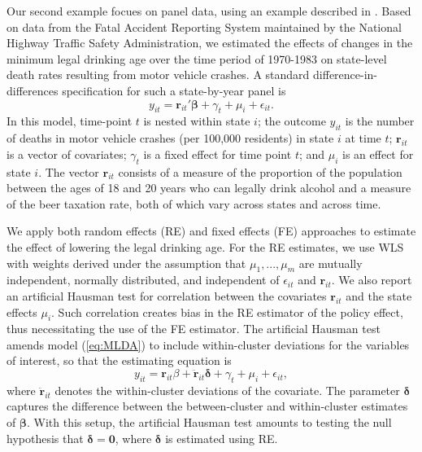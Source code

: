 \documentclass[draft]{ectaart}\usepackage[]{graphicx}\usepackage[]{color}
\newcommand{\bm}{\mathbf}
\newcommand{\bs}{\boldsymbol}
\begin{document}
Our second example focues on panel data, using an example described in \citet[see also \citealp{Carpenter2011minimum}]{Angrist2014mastering}.
Based on data from the Fatal Accident Reporting System maintained by the National Highway Traffic Safety Administration, we estimated the effects of changes in the minimum legal drinking age over the time period of 1970-1983 on state-level death rates resulting from motor vehicle crashes.
A standard difference-in-differences specification for such a state-by-year panel is
\begin{equation}
\label{eq:MLDA}
y_{it} = \bm{r}_{it}'\bs\beta + \gamma_t + \mu_i + \epsilon_{it}.
\end{equation}
In this model, time-point $t$ is nested within state $i$; the outcome $y_{it}$ is the number of deaths in motor vehicle crashes (per 100,000 residents) in state $i$ at time $t$; $\bm{r}_{it}$ is a vector of covariates; $\gamma_t$ is a fixed effect for time point $t$; and $\mu_i$ is an effect for state $i$. The vector $\bm{r}_{it}$ consists of a measure of the proportion of the population between the ages of 18 and 20 years who can legally drink alcohol and a measure of the beer taxation rate, both of which vary across states and across time.

We apply both random effects (RE) and fixed effects (FE) approaches to estimate the effect of lowering the legal drinking age. 
For the RE estimates, we use WLS with weights derived under the assumption that  $\mu_1,...,\mu_m$ are mutually independent, normally distributed, and independent of $\epsilon_{it}$ and $\bm{r}_{it}$.
We also report an artificial Hausman test \citep{Arellano1993on, Wooldridge2002econometric} for correlation between the covariates $\bm{r}_{it}$ and the state effects $\mu_i$. Such correlation creates bias in the RE estimator of the policy effect, thus necessitating the use of the FE estimator.
The artificial Hausman test amends model (\ref{eq:MLDA}) to include within-cluster deviations for the variables of interest, so that the estimating equation is
\begin{equation}
y_{it} = \bm{r}_{it}\beta + \bm{\ddot{r}}_{it}\bs\delta + \gamma_t + \mu_i + \epsilon_{it},
\end{equation}
where $\bm{\ddot{r}}_{it}$ denotes the within-cluster deviations of the covariate.
The parameter $\bs\delta$ captures the difference between the between-cluster and within-cluster estimates of $\bs\beta$. 
With this setup, the artificial Hausman test amounts to testing the null hypothesis that $\bs\delta = \bm{0}$, where $\bs\delta$ is estimated using RE.  
\end{document}
